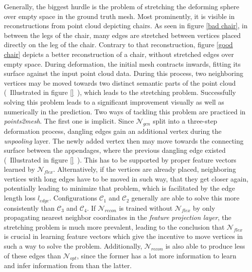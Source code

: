   Generally, the biggest hurdle is the problem of stretching the deforming sphere over empty space in the ground truth mesh. Most prominently, 
  it is visible in reconstructions from point cloud depicting chairs. As seen in figure \ref{bad chair}, in between the legs of the chair, many 
  edges are stretched between vertices placed directly on the leg of the chair.
  Contrary to that reconstruction, figure \ref{good chair} depicts a better reconstruction of a chair, without stretched edges over empty space.
  During deformation, the initial mesh contracts inwards, fitting its surface against the input point cloud data. During this process, two neighboring 
  vertices may be moved towards two distinct semantic parts of the point cloud (~Illustrated in figure \ref{}~), which leads to the stretching problem. 
  Successfully solving this problem leads to a significant improvement visually as well as numerically in the prediction.
  Two ways of tackling this problem are practiced in \emph{points2mesh}.
  The first one is implicit. Since $\mathcal{N}_{gcn}$ split into a three-step deformation process, dangling edges gain an additional vertex during
  the \emph{unpooling} layer. The newly added vertex then may move towards the connecting surface between the appendages, where the previous dangling
  edge existed (~Illustrated in figure \ref{}~). This has to be supported by proper feature vectors learned by $\mathcal{N}_{flex}$.
  Alternatively, if the vertices are already placed, neighboring vertices with long edges have to be moved in such way, that they get closer again, 
  potentially leading to minimize that problem, which is facilitated by the edge length loss $l_{edge}$.
  Configurations $\mathcal{C}_1$ and $\mathcal{C}_2$ generally are able to   solve this more consistently than $\mathcal{C}_3$ and $\mathcal{C}_4$. 
  If $\mathcal{N}_{recon}$ is trained without $\mathcal{N}_{flex}$ by only propagating nearest neighbor coordinates in the \emph{feature projection layer},
  the stretching problem is much more prevalent, leading to the conclusion that $\mathcal{N}_{flex}$ is crucial in learning feature vectors which give
  the incentive to move vertices in such a way to solve the problem.
  Additionally, $\mathcal{N}_{recon}$ is also able to produce less of these edges than $\mathcal{N}_{opt}$, since the former has a lot more information
  to learn and infer information from than the latter. 

